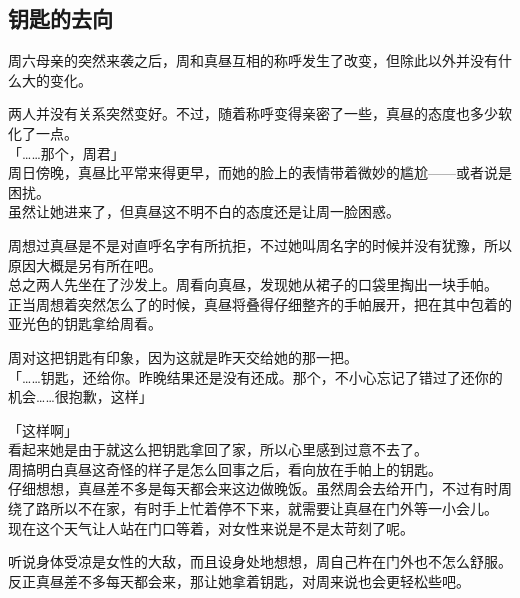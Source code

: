 \subsection{钥匙的去向}

周六母亲的突然来袭之后，周和真昼互相的称呼发生了改变，但除此以外并没有什么大的变化。

两人并没有关系突然变好。不过，随着称呼变得亲密了一些，真昼的态度也多少软化了一点。\\

「……那个，周君」\\

周日傍晚，真昼比平常来得更早，而她的脸上的表情带着微妙的尴尬——或者说是困扰。\\

虽然让她进来了，但真昼这不明不白的态度还是让周一脸困惑。

周想过真昼是不是对直呼名字有所抗拒，不过她叫周名字的时候并没有犹豫，所以原因大概是另有所在吧。\\

总之两人先坐在了沙发上。周看向真昼，发现她从裙子的口袋里掏出一块手帕。\\

正当周想着突然怎么了的时候，真昼将叠得仔细整齐的手帕展开，把在其中包着的亚光色的钥匙拿给周看。

周对这把钥匙有印象，因为这就是昨天交给她的那一把。\\

「……钥匙，还给你。昨晚结果还是没有还成。那个，不小心忘记了错过了还你的机会……很抱歉，这样」

「这样啊」\\

看起来她是由于就这么把钥匙拿回了家，所以心里感到过意不去了。\\

周搞明白真昼这奇怪的样子是怎么回事之后，看向放在手帕上的钥匙。\\

仔细想想，真昼差不多是每天都会来这边做晚饭。虽然周会去给开门，不过有时周绕了路所以不在家，有时手上忙着停不下来，就需要让真昼在门外等一小会儿。\\

现在这个天气让人站在门口等着，对女性来说是不是太苛刻了呢。

听说身体受凉是女性的大敌，而且设身处地想想，周自己杵在门外也不怎么舒服。\\

反正真昼差不多每天都会来，那让她拿着钥匙，对周来说也会更轻松些吧。\\

